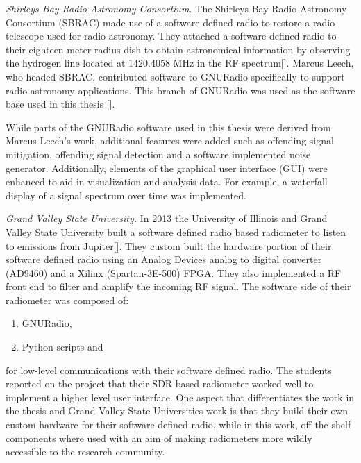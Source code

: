 
\emph{Shirleys Bay Radio Astronomy Consortium.}  The Shirleys Bay Radio Astronomy Consortium (SBRAC) made use of a software defined radio to restore a radio telescope used for radio astronomy.  They attached a software defined radio to their eighteen meter radius dish to obtain astronomical information by observing the hydrogen line located at 1420.4058 MHz in the RF spectrum[\cite{Leech2007}].  Marcus Leech, who headed SBRAC, contributed software to GNURadio specifically to support radio astronomy applications.  This branch of GNURadio was used as the software base used in this thesis [\cite{Leech}].

While parts of the GNURadio software used in this thesis were derived from Marcus Leech's work, additional features were added such as offending signal mitigation, offending signal detection and a software implemented noise generator.  Additionally, elements of the graphical user interface (GUI) were enhanced to aid in visualization and analysis data.  For example, a waterfall display of a signal spectrum over time was implemented.

\emph{Grand Valley State University.}  In 2013 the University of Illinois and Grand Valley State University built a software defined radio based radiometer to listen to emissions from Jupiter[\cite{Behnke}].  They custom built the hardware portion of their software defined radio using an Analog Devices analog to digital converter (AD9460) and a Xilinx (Spartan-3E-500) FPGA.  They also implemented a RF front end to filter and amplify the incoming RF signal.  The software side of their radiometer was composed of:

\begin{enumerate}
\item GNURadio,
\item Python scripts and
\end{enumerate}

for low-level communications with their software defined radio.  The students reported on the project that their SDR based radiometer worked well to implement a higher level user interface.  One aspect that differentiates the work in the thesis and Grand Valley State Universities work is that they build their own custom hardware for their software defined radio, while in this work, off the shelf components where used with an aim of making radiometers more wildly accessible to the research community.


